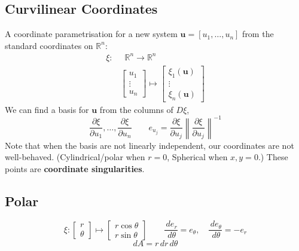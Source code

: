 \documentclass[a4paper]{article}
\newcommand{\RR}{\mathbb{R}}
\def\pp#1#2{\frac{\partial #1}{\partial #2}}
\def\dd#1#2{\frac{\,d#1}{\,d#2}}
\def\norm#1{\left\|#1\right\|}
\begin{document}
\begin{multicols}{2}
	\section*{Curvilinear Coordinates}
	A coordinate parametrisation for a new system $\textbf{u}=[u_1,\dots,u_n]$ from the standard coordinates on $\RR^n$:
	\begin{align*}
		\xi : & \;\;\RR^n\longrightarrow \RR^n         \\
		      & \begin{bmatrix}
			        u_1    \\
			        \vdots \\
			        u_n
		        \end{bmatrix}\mapsto \begin{bmatrix}
			                             \xi_1(\textbf{u}) \\
			                             \vdots            \\
			                             \xi_n(\textbf{u})
		                             \end{bmatrix}
	\end{align*}
	We can find a basis for $\textbf{u}$ from the columns of $D\xi$,
	$$\pp\xi{u_1},\dots,\pp{\xi}{u_n}\qquad e_{u_j}= \pp{\xi}{u_j}\norm{\pp{\xi}{u_j}}^{-1}$$
	Note that when the basis are not linearly independent, our coordinates are not well-behaved. (Cylindrical/polar when $r=0$, Spherical when $x,y=0$.) These points are \textbf{coordinate singularities}.

	\subsection*{Polar}
	\[
		\xi: \begin{bmatrix}
			r \\
			\theta
		\end{bmatrix} \mapsto \begin{bmatrix}
			r\cos\theta \\
			r\sin\theta
		\end{bmatrix}
		\qquad
		\dd{e_r}{\theta}=e_\theta,\quad
		\dd{e_\theta}{\theta}=-e_r
	\]
	$$dA=r\,dr\,d\theta$$


\end{multicols}
\end{document}
